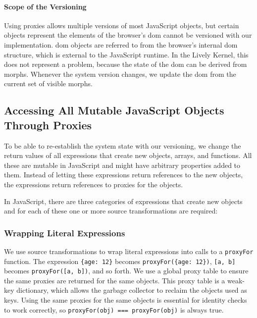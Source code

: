 \documentclass{sigplanconf}
\newcommand\hairspace{\ifmmode\mskip1mu\else\kern0.08em\fi}
\newcommand{\eg}{e.\hairspace{}g.,\xspace}
\newcommand{\ac}[1]{\gls{#1}}
\begin{document}
\paragraph{Scope of the Versioning} \label{subsubsec:IMPLEMENTATION:5.2.1}
Using proxies allows multiple versions of most JavaScript objects, but certain objects represent the elements of the browser's \ac{dom} cannot be versioned with our implementation.
\ac{dom} objects are referred to from the browser's internal \ac{dom} structure, which is external to the JavaScript runtime.
In the Lively Kernel, this does not represent a problem, because the state of the \ac{dom} can be derived from morphs.
Whenever the system version changes, we update the \ac{dom} from the current set of visible morphs.

\subsection{Accessing All Mutable JavaScript Objects Through Proxies}

To be able to re-establish the system state with our versioning, we change the return values of all expressions that create new objects, arrays, and functions.
All these are mutable in JavaScript and might have arbitrary properties added to them.
Instead of letting these expressions return references to the new objects, the expressions return references to proxies for the objects.

In JavaScript, there are three categories of expressions that create new objects and for each of these one or more source transformations are required:

\subsubsection{Wrapping Literal Expressions}

\begin{sloppypar}
We use source transformations to wrap literal expressions into calls to a \lstinline{proxyFor} function.
The expression \lstinline|{age: 12}| becomes \lstinline|proxyFor({age: 12})|, \lstinline{[a, b]} becomes \lstinline{proxyFor([a, b])}, and so forth.
We use a global proxy table to ensure the same proxies are returned for the same objects.
This proxy table is a weak-key dictionary, which allows the garbage collector to reclaim the objects used as keys.
Using the same proxies for the same objects is essential for identity checks to work correctly, so \lstinline{proxyFor(obj) === proxyFor(obj)} is always true.  
\end{sloppypar}
\end{document}

